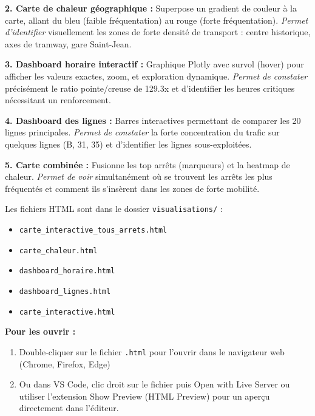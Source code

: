 \documentclass[12pt,a4paper]{article}
\begin{document}
\textbf{2. Carte de chaleur géographique :} Superpose un gradient de couleur à la carte, allant du bleu (faible fréquentation) au rouge (forte fréquentation). \textit{Permet d'identifier} visuellement les zones de forte densité de transport : centre historique, axes de tramway, gare Saint-Jean.

\textbf{3. Dashboard horaire interactif :} Graphique Plotly avec survol (hover) pour afficher les valeurs exactes, zoom, et exploration dynamique. \textit{Permet de constater} précisément le ratio pointe/creuse de 129.3x et d'identifier les heures critiques nécessitant un renforcement.

\textbf{4. Dashboard des lignes :} Barres interactives permettant de comparer les 20 lignes principales. \textit{Permet de constater} la forte concentration du trafic sur quelques lignes (B, 31, 35) et d'identifier les lignes sous-exploitées.

\textbf{5. Carte combinée :} Fusionne les top arrêts (marqueurs) et la heatmap de chaleur. \textit{Permet de voir} simultanément où se trouvent les arrêts les plus fréquentés et comment ils s'insèrent dans les zones de forte mobilité.

\begin{infobox}
Les fichiers HTML sont dans le dossier \texttt{visualisations/} :
\begin{itemize}[leftmargin=0.5cm]
    \item \texttt{carte\_interactive\_tous\_arrets.html}
    \item \texttt{carte\_chaleur.html}
    \item \texttt{dashboard\_horaire.html}
    \item \texttt{dashboard\_lignes.html}
    \item \texttt{carte\_interactive.html}
\end{itemize}

\textbf{Pour les ouvrir :}
\begin{enumerate}[leftmargin=0.5cm]
    \item Double-cliquer sur le fichier \texttt{.html} pour l'ouvrir dans le navigateur web (Chrome, Firefox, Edge)
    \item Ou dans VS Code, clic droit sur le fichier puis \og Open with Live Server \fg{} ou utiliser l'extension \og Show Preview \fg{} (HTML Preview) pour un aperçu directement dans l'éditeur.
\end{enumerate}
\end{infobox}
\end{document}
